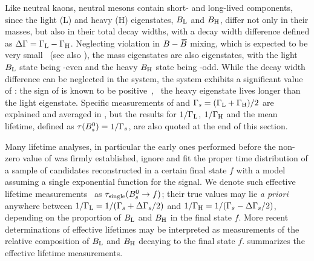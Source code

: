 %
%
%


Like neutral kaons, neutral \B mesons contain
short- and long-lived components, since the
light (L) and heavy (H)
eigenstates, $B_{\rm L}$ and $B_{\rm H}$, differ not only
in their masses, but also in their total decay widths,  
with a decay width difference defined as 
$\Delta\Gamma = \Gamma_{\rm L} - \Gamma_{\rm H}$. 
Neglecting \CP violation in $B-\kern 0.18em\overline{\kern -0.18em B}{}$ mixing, 
which is expected to be very
small~\cite{Lenz:2011ti,*Lenz:2006hd,Beneke:1998sy} (see also ),
the mass eigenstates are also \CP eigenstates,
with the light $B_{\rm L}$ state being \CP-even 
and the heavy $B_{\rm H}$ state being \CP-odd. 
While the decay width difference \DGd can be neglected in the \Bd system, 
the \Bs system exhibits a significant
value of \DGs: the sign of \DGs is known 
to be positive~\cite{Aaij:2012eq}, \ie\
the heavy eigenstate lives longer than the light eigenstate. 
Specific measurements of \DGs and 
$\Gamma_{s} = (\Gamma_{\rm L} + \Gamma_{\rm H})/2$ are explained
and averaged in , but the results for
$1/\Gamma_{\rm L}$, $1/\Gamma_{\rm H}$ and
the mean \Bs lifetime, defined as $\tau(B^0_s) = 1/\Gamma_{s}$,
are also quoted at the end of this section. 

Many \Bs lifetime analyses, in particular the early 
ones performed before the non-zero value of \DGs was 
firmly established, ignore \DGs and fit the proper time 
distribution of a sample of \Bs candidates 
reconstructed in a certain final state $f$
with a model assuming a single exponential function 
for the signal. We denote such {\rm effective lifetime}
measurements~\cite{Fleischer:2011cw} as $\tau_{\rm single}(B^0_s\to f)$; 
their true values may lie {\em a priori} anywhere
between $1/\Gamma_{\rm L} = 1/(\Gamma_{s}+\Delta\Gamma_{s}/2)$ and
$1/\Gamma_{\rm H}= 1/(\Gamma_{s}-\Delta\Gamma_{s}/2)$, 
depending on the proportion of $B_{\rm L}$ and $B_{\rm H}$
in the final state $f$. 
More recent determinations of effective lifetimes may be interpreted as
measurements of the relative composition of $B_{\rm L}$ and $B_{\rm H}$
decaying to the final state $f$. 
 summarizes the effective 
lifetime measurements.

